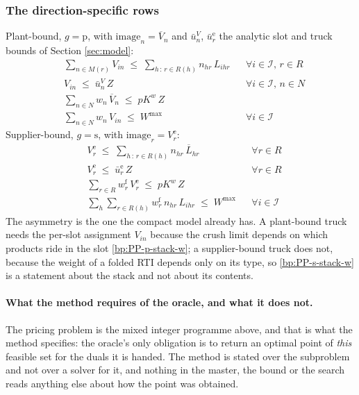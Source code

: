\subsubsection*{The direction-specific rows}
\label{sec:pp-dir}

Plant-bound, $g=\mathrm{p}$, with $\mathrm{image}_{n}=\overline{V}_{n}$
and $\bar u^{V}_{n}$, $\bar u^{\mathrm{e}}_{r}$ the analytic slot and
truck bounds of Section \ref{sec:model}:
\begin{align}
  & \sum_{n \in M(r)} V_{in} \;\le\; \sum_{h\,:\,r \in R(h)} n_{hr}\,L_{ihr}
    && \forall i \in \mathcal{I},\, r \in R \label{bp:PP-p-slot-cap}\\
  & V_{in} \;\le\; \bar u^{V}_{n}\,Z
    && \forall i \in \mathcal{I},\, n \in N \label{bp:PP-p-slot-link}\\
  & \sum_{n \in N} w_{n}\,\overline{V}_{n} \;\le\; \mathit{pK}^{w}\,Z
    \label{bp:PP-p-truck-w}\\
  & \sum_{n \in N} w_{n}\,V_{in} \;\le\; W^{\max}
    && \forall i \in \mathcal{I} \label{bp:PP-p-stack-w}
\end{align}
Supplier-bound, $g=\mathrm{s}$, with
$\mathrm{image}_{r}=V^{\mathrm{e}}_{r}$:
\begin{align}
  & V^{\mathrm{e}}_{r} \;\le\; \sum_{h\,:\,r \in R(h)} n_{hr}\,\overline{L}_{hr}
    && \forall r \in R \label{bp:PP-s-empty-cap}\\
  & V^{\mathrm{e}}_{r} \;\le\; \bar u^{\mathrm{e}}_{r}\,Z
    && \forall r \in R \label{bp:PP-s-empty-link}\\
  & \sum_{r \in R} w^{\mathrm{f}}_{r}\,V^{\mathrm{e}}_{r}
      \;\le\; \mathit{pK}^{w}\,Z \label{bp:PP-s-truck-w}\\
  & \sum_{h}\sum_{r \in R(h)} w^{\mathrm{f}}_{r}\,n_{hr}\,L_{ihr}
      \;\le\; W^{\max} && \forall i \in \mathcal{I} \label{bp:PP-s-stack-w}
\end{align}
The asymmetry is the one the compact model already has. A plant-bound
truck needs the per-slot assignment $V_{in}$ because the crush limit
depends on which products ride in the slot
\eqref{bp:PP-p-stack-w}; a supplier-bound truck does not, because the
weight of a folded RTI depends only on its type, so
\eqref{bp:PP-s-stack-w} is a statement about the stack and not about
its contents.

\paragraph{What the method requires of the oracle, and what it does not.}
The pricing problem is the mixed integer programme above, and that is
what the method specifies: the oracle's only obligation is to return an
optimal point of \emph{this} feasible set for the duals it is handed.
The method is stated over the subproblem and not over a solver for it,
and nothing in the master, the bound or the search reads anything else
about how the point was obtained.

